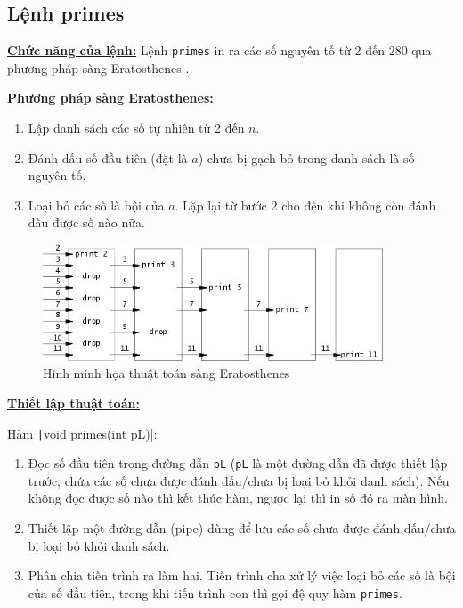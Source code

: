 \subsection{Lệnh primes}
\underline{\textbf{Chức năng của lệnh:}} Lệnh \verb|primes| in ra các số nguyên tố từ 2 đến 280 qua phương pháp sàng Eratosthenes \cite{mit-xv6} \cite{primes}.

\textbf{Phương pháp sàng Eratosthenes:}
\begin{enumerate}[labelindent=1em, labelsep=0.2cm, leftmargin=1cm, wide=\parindent, topsep=0.1cm, itemsep=-1ex, partopsep=1.5ex, parsep=1.5ex]
	\item Lập danh sách các số tự nhiên từ 2 đến $n$.
	\item Đánh dấu số đầu tiên (đặt là $a$) chưa bị gạch bỏ trong danh sách là số nguyên tố.
	\item Loại bỏ các số là bội của $a$. Lặp lại từ bước 2 cho đến khi không còn đánh dấu được số nào nữa.
\end{enumerate}

\begin{figure}[htp!]
	\centering
	\includegraphics[width=0.9\textwidth]{figures/Eratosthenes-sieve}
	\caption{Hình minh họa thuật toán sàng Eratosthenes}
\end{figure}

\underline{\textbf{Thiết lập thuật toán:}}

Hàm \texttt|void primes(int pL)|:
\begin{enumerate}[labelindent=1em, labelsep=0.2cm, leftmargin=1cm, wide=\parindent, topsep=0.1cm, itemsep=-1ex, partopsep=1.5ex, parsep=1.5ex]
	\item Đọc số đầu tiên trong đường dẫn \verb|pL| (\verb|pL| là một đường dẫn đã được thiết lập trước, chứa các số chưa được đánh dấu/chưa bị loại bỏ khỏi danh sách). Nếu không đọc được số nào thì kết thúc hàm, ngược lại thì in số đó ra màn hình.
	\item Thiết lập một đường dẫn (pipe) dùng để lưu các số chưa được đánh dấu/chưa bị loại bỏ khỏi danh sách.
	\item Phân chia tiến trình ra làm hai. Tiến trình cha xử lý việc loại bỏ các số là bội của số đầu tiên, trong khi tiến trình con thì gọi đệ quy hàm \verb|primes|.
\end{enumerate}

